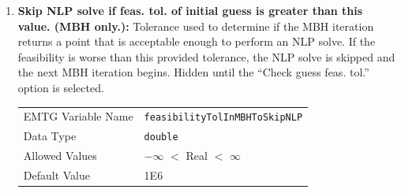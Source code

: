 \begin{enumerate}
    \item \textbf{Skip \ac{NLP} solve if feas. tol. of initial guess is greater than this value. (\ac{MBH} only.):} Tolerance used to determine if the \ac{MBH} iteration returns a point that is acceptable enough to perform an \ac{NLP} solve. If the feasibility is worse than this provided tolerance, the \ac{NLP} solve is skipped and the next \ac{MBH} iteration begins. Hidden until the ``Check guess feas. tol.'' option is selected.
    \begin{table}[H]
        \hspace{2cm}
        \begin{tabular}{lp{5cm}}
        \ac{EMTG} Variable Name & \verb|feasibilityTolInMBHToSkipNLP| \\
        Data Type & \verb|double| \\
        Allowed Values & $-\infty$ $<$ Real $<$ $\infty$ \\
        Default Value & 1E6 \\
        \end{tabular}
    \end{table}
    
\end{enumerate}



